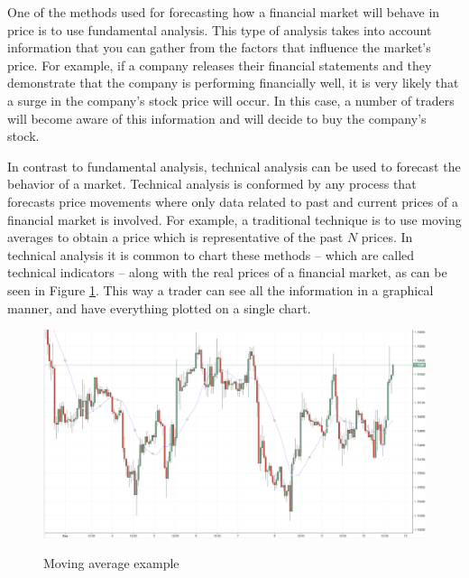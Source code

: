One of the methods used for forecasting how a financial market will behave in price is to use fundamental analysis. This type of analysis takes into account information that you can gather from the factors that influence the market's price. For example, if a company releases their financial statements and they demonstrate that the company is performing financially well, it is very likely that a surge in the company's stock price will occur. In this case, a number of traders will become aware of this information and will decide to buy the company's stock.

In contrast to fundamental analysis, technical analysis can be used to forecast the behavior of a market. Technical analysis is conformed by any process that forecasts price movements where only data related to past and current prices of a financial market is involved. For example, a traditional technique is to use moving averages to obtain a price which is representative of the past $N$ prices. In technical analysis it is common to chart these methods -- which are called technical indicators -- along with the real prices of a financial market, as can be seen in Figure \ref{figure:moving-average-example}. This way a trader can see all the information in a graphical manner, and have everything plotted on a single chart.


\begin{figure}
\caption{Moving average example}
\centering
\includegraphics[width=1.0\textwidth]{img/moving-average.png}
\label{figure:moving-average-example}
\end{figure}

